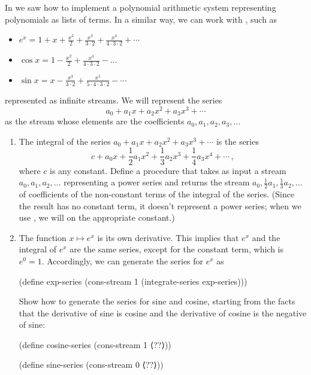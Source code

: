 \begin{exercise}
	\label{Exercise 3.59}
	In  we saw how to implement a polynomial arithmetic system representing polynomials as lists of terms.
	In a similar way, we can work with , such as
	\begin{itemize}

		\item
			\( e^x = 1 + x + \frac{x^2}{2} + \frac{x^3}{3 ⋅ 2} + \frac{x^4}{4 ⋅ 3 ⋅ 2} + \dotsb \)

		\item
			\( \cos x = 1 - \frac{x^2}{2} + \frac{x^4}{4 ⋅ 3 ⋅ 2} - \dots \)

		\item
			\( \sin x = x - \frac{x^3}{3 ⋅ 2} + \frac{x^5}{5 ⋅ 4 ⋅ 3 ⋅ 2} - \dotsb \)

	\end{itemize}
	represented as infinite streams.
	We will represent the series
	\[
		a_0 + a_1 x + a_2 x^2 + a_3 x^3 + \dotsb
	\]
	as the stream whose elements are the coefficients \( a_0, a_1, a_2, a_3, \dotsc \)
	\begin{enumerate}[label=\alph*., leftmargin=*]

		\item
			The integral of the series \( a_0 + a_1 x + a_2 x^2 + a_3 x^3 + \dotsb \) is the series
			\[
				c
				+ a_0 x
				+ \frac{1}{2} a_1 x^2
				+ \frac{1}{3} a_2 x^3
				+ \frac{1}{4} a_3 x^4
				+ \dotsb \,,
			\]
			where \( c \) is any constant.
			Define a procedure  that takes as input a stream \( a_0, a_1, a_2, \dotsc \) representing a power series and returns the stream \( a_0, \frac{1}{2} a_1, \frac{1}{3} a_2, \dotsc \) of coefficients of the non-constant terms of the integral of the series.
			(Since the result has no constant term, it doesn’t represent a power series;
			when we use , we will  on the appropriate constant.)

			\item
				The function \( x \mapsto e^x \) is its own derivative.
				This implies that \( e^x \) and the integral of \( e^x \) are the same series, except for the constant term, which is \( e^0 = 1 \).
				Accordingly, we can generate the series for \( e^x \) as
				\begin{scheme}
				  (define exp-series
				    (cons-stream 1 (integrate-series exp-series)))
				\end{scheme}

				Show how to generate the series for sine and cosine, starting from the facts that the derivative of sine is cosine and the derivative of cosine is the negative of sine:
				\begin{scheme}
				  (define cosine-series (cons-stream 1 ⟨??⟩))

				  (define sine-series (cons-stream 0 ⟨??⟩))
				\end{scheme}

		\end{enumerate}
\end{exercise}



